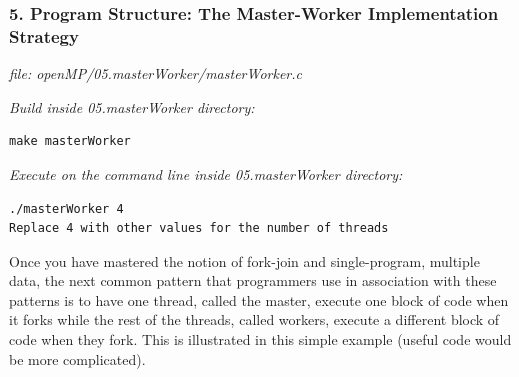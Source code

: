 \documentclass[letterpaper,10pt,openany,oneside]{sphinxmanual}
\begin{document}
\subsubsection{5. Program Structure: The Master-Worker Implementation Strategy}
\label{SharedMemory/ProgStructure_Barrier:program-structure-the-master-worker-implementation-strategy}
\emph{file: openMP/05.masterWorker/masterWorker.c}

\emph{Build inside 05.masterWorker directory:}

\begin{Verbatim}[commandchars=\\\{\}]
make masterWorker
\end{Verbatim}

\emph{Execute on the command line inside 05.masterWorker directory:}

\begin{Verbatim}[commandchars=\\\{\}]
./masterWorker 4
Replace 4 with other values for the number of threads
\end{Verbatim}

Once you have mastered the notion of fork-join and single-program, multiple data,
the next common pattern that programmers use in association with these patterns
is to have one thread, called the master, execute one block of code when it forks while the rest
of the threads, called workers, execute a different block of code when they fork.
This is illustrated in this simple example (useful code would be more complicated).
\end{document}
